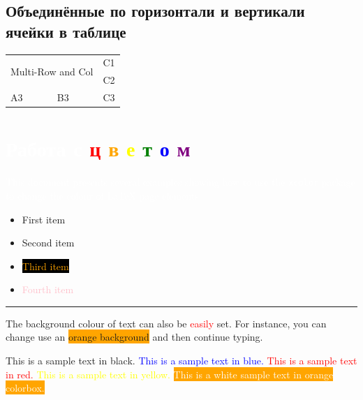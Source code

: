 \documentclass{article}
\begin{document}
\subsection{Объединённые по горизонтали и вертикали ячейки в таблице}
\begin{tabular}{|l|l|l|}
    \hline
    \multicolumn{2}{|c|}{\multirow{2}{*}{Multi-Row and Col}} & C1 \\
    \cline{3-3}
    \multicolumn{2}{|c|}{} & C2 \\
    \hline
    A3 & B3 & C3 \\
    \hline
\end{tabular}
\clearpage

\section[Работа с текстом]{\textcolor{white}{Работа с} \label{second}
    \colorbox{ashgrey}{
        \textcolor{red}{ц}
        \textcolor{orange}{в}
        \textcolor{yellow}{е}
        \textcolor{green}{т}
        \textcolor{blue}{о}
        \textcolor{purple}{м}
        }
}
\pagecolor{mygreen}\afterpage{\nopagecolor}

\textcolor{white}{This document presents several examples showing how to use the \texttt{xcolor} package to change the colour of \LaTeX{} page elements.}

\begin{itemize}
\color{green}
\item First item
\item Second item
\color{orange}
\item \textcolor{orange}{\colorbox{black}{Third item}}
\item \textcolor{pink}{Fourth item}
\end{itemize}

\noindent
{\color{red} \rule{\linewidth}{0.5mm}}

The background colour of text can also be \textcolor{red}{easily} set. For instance, you can change use an \colorbox{orange}{orange background} and then continue typing.

This is a sample text in black.
\textcolor{blue}{This is a sample text in blue.}
\textcolor{red}{This is a sample text in red.}
\textcolor{yellow}{This is a sample text in yellow.}
\textcolor{white}{\colorbox{orange}{This is a white sample text in orange colorbox.}}\\
\end{document}
